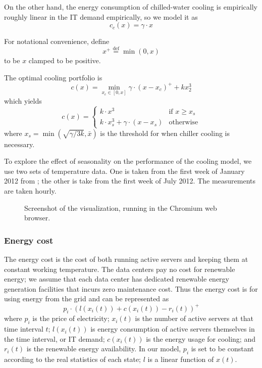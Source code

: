 \documentclass{acm_proc_article-sp}
\newcommand{\eqdef}{\ensuremath{\overset{\mathrm{def}}{=}}}
\begin{document}
On the other hand, the energy consumption of chilled-water cooling is empirically roughly linear in the IT demand empirically, so we model it as
\begin{equation}
c_c(x) = \gamma \cdot x
\end{equation}

For notational convenience, define
\begin{equation}
	x^+ \eqdef \min(0, x)
\end{equation}
to be $x$ clamped to be positive.

The optimal cooling portfolio is
\begin{equation}
c(x) = \min_{x_c \in [0,x]} \gamma \cdot (x-x_c)^+ + kx_2^3
\end{equation}
which yields
$$
c(x) = \left\{ \begin{array}{ll}
	k \cdot x^3 & \mbox{if $x \geq x_s$}\\
	k \cdot x_s^3 + \gamma \cdot (x-x_s) & \mbox{otherwise}\end{array} \right.
$$
where $x_s = \min \left(\sqrt{\gamma/3k}, \bar{x}\right)$ is the threshold for when chiller cooling is necessary.

To explore the effect of seasonality on the performance of the cooling model, we use two sets of temperature data. One is taken from the first week of January 2012 from \cite{temp}; the other is take from the first week of July 2012. The measurements are taken hourly.

\begin{figure*}
\centering
{}
\caption{Screenshot of the visualization, running in the Chromium web browser.}
\end{figure*}
\subsubsection{Energy cost}
The energy cost is the cost of both running active servers and keeping them at constant working temperature. The data centers pay no cost for renewable energy; we assume that each data center has dedicated renewable energy generation facilities that incurs zero maintenance cost. Thus the energy cost is for using energy from the grid and can be represented as
\begin{equation}
p_i \cdot (l(x_i(t)) + c(x_i(t)) - r_i(t))^+
\end{equation}
where $p_i$ is the price of electricity; $x_i(t)$ is the number of active servers at that time interval $t$; $l(x_i(t))$ is energy consumption of active servers themselves in the time interval, or IT demand; $c(x_i(t))$ is the energy usage for cooling; and $r_i(t)$ is the renewable energy availability. In our model, $p_i$ is set to be constant according to the real statistics of each state; $l$ is a linear function of $x(t)$.
\end{document}
